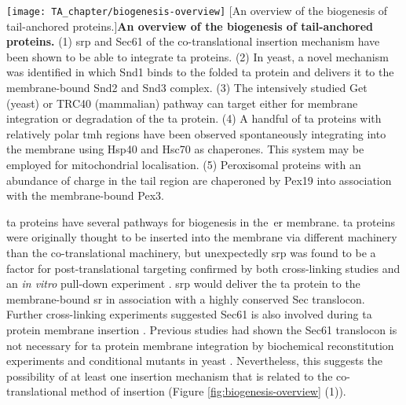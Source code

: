 \begin{sidewaysfigure}
\centering
\texttt{[image: TA\_chapter/biogenesis-overview]}
        [An overview of the biogenesis of tail-anchored proteins.]{\textbf{An overview of the biogenesis of tail-anchored proteins.}
        (1) \gls{srp} and Sec61 of the co-translational insertion mechanism have been shown to be able to integrate \gls{ta} proteins.
        (2) In yeast, a novel mechanism was identified in which Snd1 binds to the folded \gls{ta} protein and delivers it to the membrane\--bound Snd2 and Snd3 complex.
        (3) The intensively studied Get (yeast) or TRC40 (mammalian) pathway can target either for membrane integration or degradation of the \gls{ta} protein.
        (4) A handful of \gls{ta} proteins with relatively polar \gls{tmh} regions have been observed spontaneously integrating into the membrane using Hsp40 and Hsc70 as chaperones.
        This system may be employed for mitochondrial localisation.
        (5) Peroxisomal proteins with an abundance of charge in the tail region are chaperoned by Pex19 into association with the membrane\--bound Pex3.
}

\label{fig:biogenesis-overview}
\end{sidewaysfigure}

\gls{ta} proteins have several pathways for biogenesis in the~\gls{er} membrane.
\gls{ta} proteins were originally thought to be inserted into the membrane via different machinery than the co-translational machinery, but unexpectedly \gls{srp} was found to be a factor for post-translational targeting confirmed by both cross-linking studies \cite{Abell2004} and an \textit{in vitro} pull-down experiment \cite{Leznicki2010}.
\gls{srp} would deliver the \gls{ta} protein to the membrane\--bound \gls{sr} in association with a highly conserved Sec translocon.
Further cross-linking experiments suggested Sec61 is also involved during \gls{ta} protein membrane insertion \cite{Abell2003}.
Previous studies had shown the Sec61 translocon is not necessary for \gls{ta} protein membrane integration by biochemical reconstitution experiments \cite{Kutay1993} and conditional mutants in yeast \cite{Steel2002, Yabal2003}. %
Nevertheless, this suggests the possibility of at least one insertion mechanism that is related to the co-translational method of insertion (Figure \ref{fig:biogenesis-overview} (1)).

